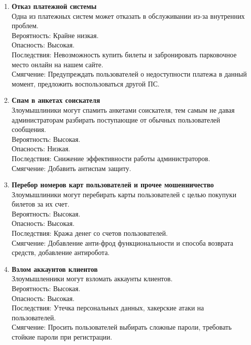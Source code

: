 \begin{enumerate}
      \item \textbf{Отказ платежной системы} \\
            Одна из платежных систем может отказать в обслуживании из-за 
            внутренних проблем. \\
            Вероятность: Крайне низкая. \\
            Опасность: Высокая. \\
            Последствия: Невозможность купить билеты и забронировать 
            парковочное место онлайн на нашем сайте. \\
            Смягчение: Предупреждать пользователей о недоступности платежа в 
            данный момент, предложить воспользоваться другой ПС.
      
      \item \textbf{Спам в анкетах соискателя} \\
            Злоумышлиники могут спамить анкетами соискателя, тем самым
            не давая администраторам разбирать поступающие от обычных 
            пользователей сообщения. \\
            Вероятность: Высокая. \\
            Опасность: Низкая. \\
            Последствия: Снижение эффективности работы администраторов. \\
            Смягчение: Добавить антиспам защиту.

      \item \textbf{Перебор номеров карт пользователей и прочее мошенничество} \\
            Злоумышлиники могут перебирать карты пользователей с целью покупуки
            билетов за их счет. \\
            Вероятность: Высокая. \\
            Опасность: Высокая. \\
            Последствия: Кража денег со счетов пользователей. \\
            Смягчение: Добавление анти-фрод функциональности и способа возврата средств,
            добавление антиробота. 
      
      \item \textbf{Взлом аккаунтов клиентов} \\
            Злоумышленники могут взломать аккаунты клиентов. \\
            Вероятность: Высокая. \\
            Опасность: Высокая. \\
            Последствия: Утечка персональных данных, хакерские атаки на пользователей. \\
            Смягчение: Просить пользователей выбирать сложные пароли, требовать 
            стойкие пароли при регистрации.


\end{enumerate}
